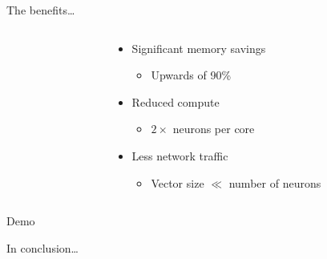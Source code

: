 \documentclass[t]{beamer}
\begin{document}
\begin{frame}{The benefits\ldots}
  \begin{columns}[c]
    \begin{column}{.35\textwidth}%
      
    \end{column}\hfill
    \begin{column}{.62\textwidth}
      \begin{itemize}
        \item Significant memory savings
        \begin{itemize}
          \item<2-> Upwards of 90\%
        \end{itemize}
        \item Reduced compute
        \begin{itemize}
          \item<3-> $2\times$ neurons per core
        \end{itemize}
        \item Less network traffic
        \begin{itemize}
          \item<4-> Vector size $\ll$ number of neurons
        \end{itemize}
      \end{itemize}
    \end{column}
  \end{columns}
\end{frame}

\begin{darkframes}
  \begin{frame}{\hspace{1em}}
    \centering
    \vfill
    {\huge Demo}
    \vfill
  \end{frame}
\end{darkframes}

\begin{frame}{In conclusion\ldots}
  
\end{frame}

\begin{darkframes}
\end{darkframes}
  
\end{document}
